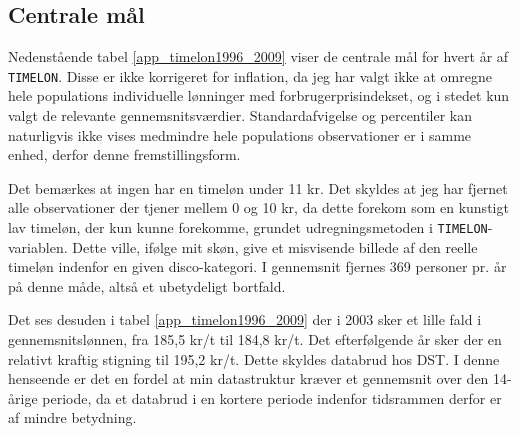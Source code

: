 \subsection{Centrale mål \label{}}

Nedenstående tabel \ref{app_timelon1996_2009} viser de centrale mål for hvert år af \texttt{TIMELON}. Disse er ikke korrigeret for inflation, da jeg har valgt ikke at omregne hele populations individuelle lønninger med forbrugerprisindekset, og i stedet kun valgt de relevante gennemsnitsværdier. Standardafvigelse og percentiler kan naturligvis ikke vises medmindre hele populations observationer er i samme enhed, derfor denne fremstillingsform. 

Det bemærkes at ingen har en timeløn under 11 kr. Det skyldes at jeg har fjernet alle observationer der tjener mellem 0 og 10 kr, da dette forekom som en kunstigt lav timeløn, der kun kunne forekomme, grundet udregningsmetoden i \texttt{TIMELON}-variablen. Dette ville, ifølge mit skøn, give et misvisende billede af den reelle timeløn indenfor en given disco-kategori. I gennemsnit fjernes 369 personer pr. år på denne måde, altså et ubetydeligt bortfald. 

Det ses desuden i tabel \ref{app_timelon1996_2009} der i 2003 sker et lille fald i gennemsnitslønnen, fra 185,5 kr/t til 184,8 kr/t. Det efterfølgende år sker der en relativt kraftig stigning til 195,2 kr/t. Dette skyldes databrud hos DST. I denne henseende er det en fordel at min datastruktur kræver et gennemsnit over den 14-årige periode, da et databrud i en kortere periode indenfor tidsrammen derfor er af mindre betydning. 

